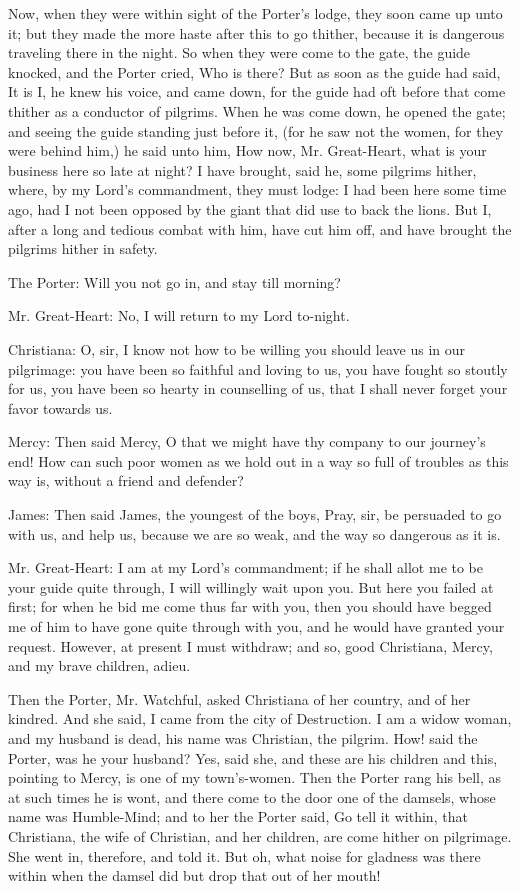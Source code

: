 Now, when they were within sight of the Porter's lodge, they soon came up unto it; but they made the more haste after this to go thither, because it is dangerous traveling there in the night. So when they were come to the gate, the guide knocked, and the Porter cried, Who is there? But as soon as the guide had said, It is I, he knew his voice, and came down, for the guide had oft before that come thither as a conductor of pilgrims. When he was come down, he opened the gate; and seeing the guide standing just before it, (for he saw not the women, for they were behind him,) he said unto him, How now, Mr. Great-Heart, what is your business here so late at night? I have brought, said he, some pilgrims hither, where, by my Lord's commandment, they must lodge: I had been here some time ago, had I not been opposed by the giant that did use to back the lions. But I, after a long and tedious combat with him, have cut him off, and have brought the pilgrims hither in safety.

The Porter: Will you not go in, and stay till morning?

Mr. Great-Heart: No, I will return to my Lord to-night.

Christiana: O, sir, I know not how to be willing you should leave us in our pilgrimage: you have been so faithful and loving to us, you have fought so stoutly for us, you have been so hearty in counselling of us, that I shall never forget your favor towards us.

Mercy: Then said Mercy, O that we might have thy company to our journey's end! How can such poor women as we hold out in a way so full of troubles as this way is, without a friend and defender?

James: Then said James, the youngest of the boys, Pray, sir, be persuaded to go with us, and help us, because we are so weak, and the way so dangerous as it is.

Mr. Great-Heart: I am at my Lord's commandment; if he shall allot me to be your guide quite through, I will willingly wait upon you. But here you failed at first; for when he bid me come thus far with you, then you should have begged me of him to have gone quite through with you, and he would have granted your request. However, at present I must withdraw; and so, good Christiana, Mercy, and my brave children, adieu.

Then the Porter, Mr. Watchful, asked Christiana of her country, and of her kindred. And she said, I came from the city of Destruction. I am a widow woman, and my husband is dead, his name was Christian, the pilgrim. How! said the Porter, was he your husband? Yes, said she, and these are his children and this, pointing to Mercy, is one of my town's-women. Then the Porter rang his bell, as at such times he is wont, and there come to the door one of the damsels, whose name was Humble-Mind; and to her the Porter said, Go tell it within, that Christiana, the wife of Christian, and her children, are come hither on pilgrimage. She went in, therefore, and told it. But oh, what noise for gladness was there within when the damsel did but drop that out of her mouth!

